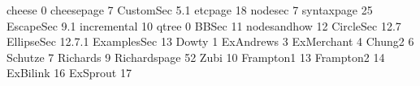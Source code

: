 \fdef cheese {0}
\fdef cheesepage {7}
\fdef CustomSec {5.1}
\fdef etcpage {18}
\fdef nodesec {7}
\fdef syntaxpage {25}
\fdef EscapeSec {9.1}
\fdef incremental {10}
\fdef qtree {0}
\fdef BBSec {11}
\fdef nodesandhow {12}
\fdef CircleSec {12.7}
\fdef EllipseSec {12.7.1}
\fdef ExamplesSec {13}
\fdef Dowty {1}
\fdef ExAndrews {3}
\fdef ExMerchant {4}
\fdef Chung2 {6}
\fdef Schutze {7}
\fdef Richards {9}
\fdef Richardspage {52}
\fdef Zubi {10}
\fdef Frampton1 {13}
\fdef Frampton2 {14}
\fdef ExBilink {16}
\fdef ExSprout {17}
